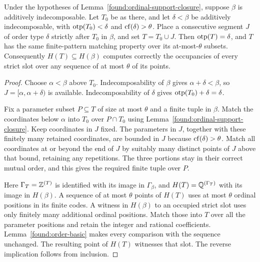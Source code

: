 \begin{lemma}
\label{found:append-segment}
Under the hypotheses of Lemma~\ref{found:ordinal-support-closure},
suppose $\beta$ is additively indecomposable. Let $T_0$ be as
there, and let $\delta<\beta$ be additively indecomposable,
with $\operatorname{otp}(T_0)<\delta$ and $\operatorname{cf}(\delta)>\theta$.
Place a consecutive segment $J$ of order type $\delta$
strictly after $T_0$ in $\beta$, and set $T=T_0\cup J$.
Then $\operatorname{otp}(T)=\delta$, and $T$ has the same finite-pattern
matching property over its at-most-$\theta$ subsets.
Consequently $H(T)\subseteq H(\beta)$ computes correctly
the occupancies of every strict slot over any sequence of
at most $\theta$ of its points.
\end{lemma}

\begin{proof}
Choose $\alpha<\beta$ above $T_0$. Indecomposability of
$\beta$ gives $\alpha+\delta<\beta$, so
$J=[\alpha,\alpha+\delta)$ is available. Indecomposability
of $\delta$ gives $\operatorname{otp}(T_0)+\delta=\delta$.

Fix a parameter subset $P\subseteq T$ of size at most
$\theta$ and a finite tuple in $\beta$. Match the
coordinates below $\alpha$ into $T_0$ over $P\cap T_0$
using Lemma~\ref{found:ordinal-support-closure}. Keep
coordinates in $J$ fixed. The parameters in $J$, together
with these finitely many retained coordinates, are bounded
in $J$ because $\operatorname{cf}(\delta)>\theta$. Match all coordinates
at or beyond the end of $J$ by suitably many distinct
points of $J$ above that bound, retaining any repetitions.
The three portions stay in their correct mutual order,
and this gives the required finite tuple over $P$.

Here $\Gamma_T=\mathbb Z^{(T)}$ is identified with its image in
$\Gamma_\beta$, and $H(T)=\mathbb Q^{(\Gamma_T)}$ with its image
in $H(\beta)$. A sequence of at most $\theta$ points of
$H(T)$ uses at most $\theta$ ordinal positions in its
finite codes. A witness in $H(\beta)$ to an occupied
strict slot uses only finitely many additional ordinal
positions. Match those into $T$ over all the parameter
positions and retain the integer and rational
coefficients. Lemma~\ref{found:order-basic} makes every
comparison with the sequence unchanged. The resulting
point of $H(T)$ witnesses that slot. The reverse
implication follows from inclusion.
\end{proof}

